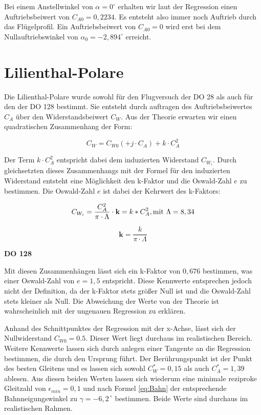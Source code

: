 Bei einem Anstellwinkel von $\alpha = 0^{\circ}$ erhalten wir laut der Regression einen Auftriebsbeiwert von $C_{A0} = 0,2234$. Es entsteht also immer noch Auftrieb durch das Flügelprofil. 
Ein Auftriebsbeiwert von $C_{A0} = 0$ wird erst bei dem Nullauftriebswinkel von $\alpha_0 = -2,894^{\circ}$ erreicht.

\section{Lilienthal-Polare}
\label{s:Finn-LP}
Die Lilienthal-Polare wurde sowohl für den Flugversuch der DO 28 als auch für den der DO 128 bestimmt. Sie entsteht durch auftragen des Auftriebsbeiwertes $C_A$ über den Widerstandsbeiwert $C_W$. 
Aus der Theorie erwarten wir einen quadratischen Zusammenhang der Form:

\begin{equation}
C_W = C_{W0} (+ j \cdot C_A) + k \cdot C_{A}^2
\end{equation}

Der Term $k \cdot C_{A}^2$ entspricht dabei dem induzierten Widerstand $C_{W_i}$. Durch gleichsetzten dieses Zusammenhangs mit der Formel für den induzierten Widerstand entsteht eine Möglichkeit den k-Faktor und die Oswald-Zahl $e$ zu bestimmen. Die Oswald-Zahl $e$ ist dabei der Kehrwert des k-Faktors:

\begin{equation}
C_{W_{i}}=\frac{C_A^2}{\pi \cdot \Lambda}\cdot \textbf{k}=k*C_A^2, \\ \mathrm{mit} \ \Lambda=8,34 
\end{equation}

\begin{equation}
\textbf{k}= \frac{k}{\pi \cdot \Lambda}
\end{equation}

\textbf{DO 128}

Mit diesen Zusammenhängen lässt sich ein k-Faktor von $0,676$ bestimmen, was einer Oswald-Zahl von $e = 1,5$ entspricht. Diese Kennwerte entsprechen jedoch nicht der Definition, da der k-Faktor stets größer Null ist und die Oswald-Zahl stets kleiner als Null. Die Abweichung der Werte von der Theorie ist wahrscheinlich mit der ungenauen Regression zu erklären.

Anhand des Schnittpunktes der Regression mit der x-Achse, lässt sich der Nullwiderstand $C_{W0} = 0.5$. Dieser Wert liegt durchaus im realistischen Bereich. Weitere Kennwerte lassen sich durch anlegen einer Tangente an die Regression bestimmen, die durch den Ursprung führt. Der Berührungspunkt ist der Punkt des besten Gleitens und es lassen sich sowohl $C_W^* = 0,15$ als auch $C_A^* = 1,39$ ablesen. Aus diesen beiden Werten lassen sich wiederum eine minimale reziproke Gleitzahl von $\epsilon_{min} = 0,1$ und nach Formel \ref{eq:Bahn} der entsprechende Bahnneigungswinkel zu $\gamma=-6,2^{\ \circ}$ bestimmen. Beide Werte sind durchaus im realistischen Rahmen.

